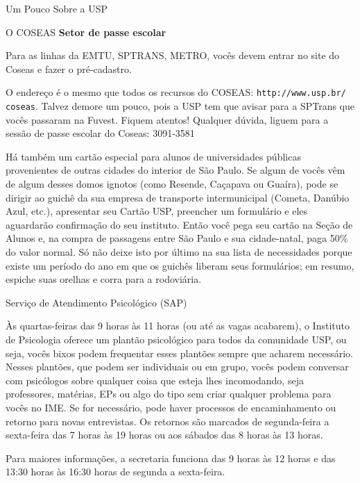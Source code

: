 \begin{secao}{Um Pouco Sobre a USP}
\begin{subsecao}{O COSEAS}
{\bf Setor de passe escolar}

Para as linhas da EMTU, SPTRANS, METRO, vocês devem entrar no site do Coseas e fazer
o pré-cadastro.

O endereço é o mesmo que todos os recursos do COSEAS: {\tt http://www.usp.br/
coseas}. Talvez demore um pouco, pois a USP tem que avisar para a SPTrans que vocês
passaram na Fuvest. Fiquem atentos! Qualquer dúvida, liguem para a sessão de passe
escolar do Coseas: 3091-3581

Há também um cartão especial para alunos de universidades públicas provenientes
de outras cidades do interior de São Paulo. Se algum de vocês vêm de algum desses domos
ignotos (como Resende, Caçapava ou Guaíra), pode se dirigir ao guichê da sua empresa de
transporte intermunicipal (Cometa, Danúbio Azul, etc.), apresentar seu Cartão USP,
preencher um formulário e eles aguardarão confirmação do seu instituto. Então
você pega seu cartão na Seção de Alunos e, na compra de passagens entre São Paulo
e sua cidade-natal, paga 50\% do valor normal. Só não deixe isto por último na
sua lista de necessidades porque existe um período do ano em que os guichês
liberam seus formulários; em resumo, espiche suas orelhas e corra para a rodoviária.

\end{subsecao}

\begin{subsecao}{Serviço de Atendimento Psicológico (SAP)}

Às quartas-feiras das 9 horas às 11 horas (ou até as vagas acabarem),
o Instituto de Psicologia oferece um plantão psicológico para todos da
comunidade USP, ou seja, vocês bixos podem frequentar esses plantões sempre
que acharem necessário. Nesses plantões, que podem ser individuais ou em
grupo, vocês podem conversar com psicólogos sobre qualquer coisa que esteja lhes
incomodando, seja professores, matérias, EPs ou algo do tipo sem criar qualquer
problema para vocês no IME. Se for necessário, pode haver processos de
encaminhamento ou retorno para novas entrevistas. Os retornos são marcados de
segunda-feira a sexta-feira das 7 horas às 19 horas ou aos sábados das
8 horas às 13 horas.

Para maiores informações, a secretaria funciona das 9 horas às 12 horas e das
13:30 horas às 16:30 horas de segunda a sexta-feira.

\end{subsecao}
\pagebreak


\end{secao}
